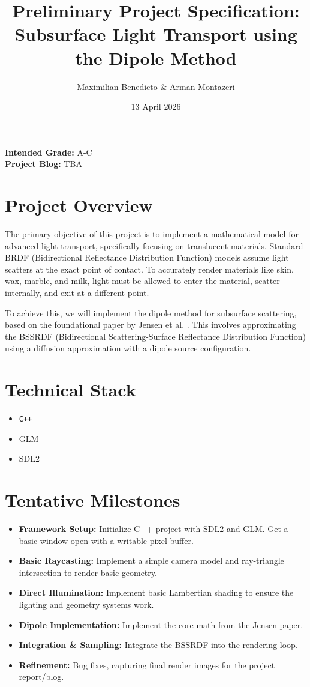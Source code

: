\documentclass{article}
\title{Preliminary Project Specification: Subsurface Light Transport using the Dipole Method}
\author{Maximilian Benedicto \& Arman Montazeri}
\date{13 April 2026}
\begin{document}
\maketitle

\noindent
\textbf{Intended Grade:} A-C \\
\textbf{Project Blog:} TBA

\section{Project Overview}
The primary objective of this project is to implement a mathematical model for advanced light transport, specifically focusing on translucent materials. Standard BRDF (Bidirectional Reflectance Distribution Function) models assume light scatters at the exact point of contact. To accurately render materials like skin, wax, marble, and milk, light must be allowed to enter the material, scatter internally, and exit at a different point.

To achieve this, we will implement the dipole method for subsurface scattering, based on the foundational paper by Jensen et al. \cite{jensen2001practical}. This involves approximating the BSSRDF (Bidirectional Scattering-Surface Reflectance Distribution Function) using a diffusion approximation with a dipole source configuration.

\section{Technical Stack}
\begin{itemize}
    \item \texttt{C++}
    \item GLM
    \item SDL2
\end{itemize}

\section{Tentative Milestones}
\begin{itemize}
    \item \textbf{Framework Setup:} Initialize C++ project with SDL2 and GLM. Get a basic window open with a writable pixel buffer.
    \item \textbf{Basic Raycasting:} Implement a simple camera model and ray-triangle intersection to render basic geometry.
    \item \textbf{Direct Illumination:} Implement basic Lambertian shading to ensure the lighting and geometry systems work.
    \item \textbf{Dipole Implementation:} Implement the core math from the Jensen paper.
    \item \textbf{Integration \& Sampling:} Integrate the BSSRDF into the rendering loop.
    \item \textbf{Refinement:} Bug fixes, capturing final render images for the project report/blog.
\end{itemize}
\end{document}

